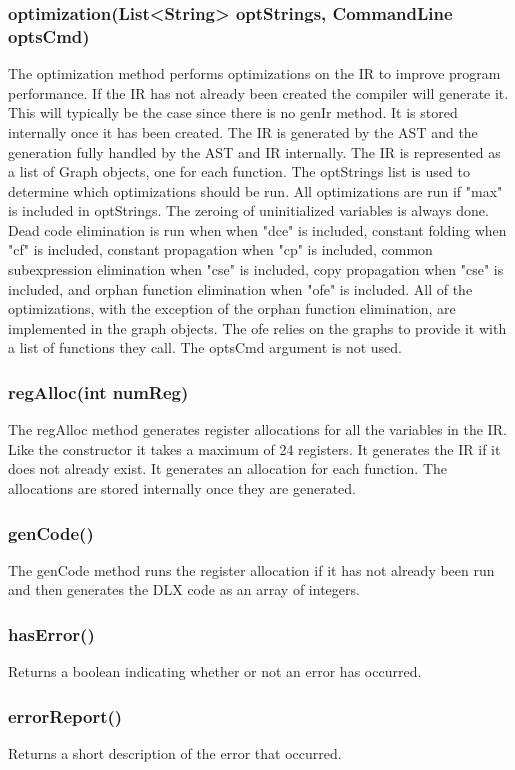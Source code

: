 \subsubsection*{optimization(List<String> optStrings, CommandLine optsCmd)}
The optimization method performs optimizations on the IR to improve program performance. If the IR has not already been created the compiler will generate it. This will typically be the case since there is no genIr method. It is stored internally once it has been created. The IR is generated by the AST and the generation fully handled by the AST and IR internally. The IR is represented as a list of Graph objects, one for each function. The optStrings list is used to determine which optimizations should be run. All optimizations are run if "max" is included in optStrings. The zeroing of uninitialized variables is always done. Dead code elimination is run when when "dce" is included, constant folding when "cf" is included, constant propagation when "cp" is included, common subexpression elimination when "cse" is included, copy propagation when "cse" is included, and orphan function elimination when "ofe" is included. All of the optimizations, with the exception of the orphan function elimination, are implemented in the graph objects. The ofe relies on the graphs to provide it with a list of functions they call. The optsCmd argument is not used. 
\subsubsection*{regAlloc(int numReg)}
The regAlloc method generates register allocations for all the variables in the IR. Like the constructor it takes a maximum of 24 registers. It generates the IR if it does not already exist. It generates an allocation for each function. The allocations are stored internally once they are generated. 
\subsubsection*{genCode()}
The genCode method runs the register allocation if it has not already been run and then generates the DLX code as an array of integers. 
\subsubsection*{hasError()}
Returns a boolean indicating whether or not an error has occurred. 
\subsubsection*{errorReport()}
Returns a short description of the error that occurred. 

